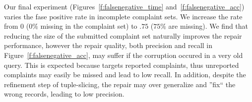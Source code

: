 
% 
% 
% 


Our final experiment (Figures~\ref{f:falsenegative_time} and~\ref{f:falsenegative_acc}) varies the fase positive rate in incomplete complaint sets.
We increase the rate from $0$ ($0\%$ missing in the complaint set) to $.75$ ($75\%$ are missing).  
We find that reducing the size of the submitted complaint set naturally improves the repair performance,
however the repair quality, both precision and recall in Figure~\ref{f:falsenegative_acc}, may suffer if the corruption occured in a very old query. 
This is expected because \sys targets reported complaints, thus unreported complaints may easily be missed and lead to low recall.
In addition, despite the refinement step of tuple-slicing, the repair may over generalize and ''fix`` the wrong records, leading to low precision.



